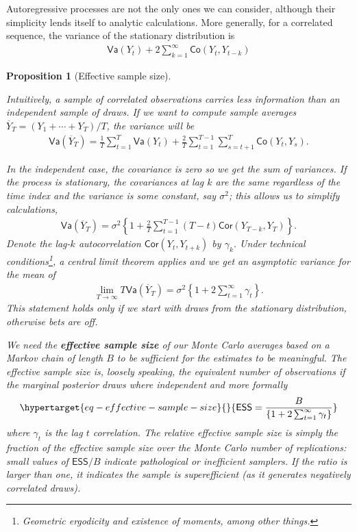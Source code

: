 \documentclass[
  11pt,
  letterpaper,
]{scrbook}
\theoremstyle{definition}
\theoremstyle{definition}
\theoremstyle{definition}
\theoremstyle{plain}
\newtheorem{proposition}{Proposition}[chapter]
\theoremstyle{remark}
\begin{document}
Autoregressive processes are not the only ones we can consider, although
their simplicity lends itself to analytic calculations. More generally,
for a correlated sequence, the variance of the stationary distribution
is \begin{align*}
\mathsf{Va}(Y_t) + 2 \sum_{k=1}^\infty \mathsf{Co}(Y_t, Y_{t-k})
\end{align*}

\begin{proposition}[Effective sample
size]\protect\hypertarget{prp-variance-clt}{}\label{prp-variance-clt}

Intuitively, a sample of correlated observations carries less
information than an independent sample of draws. If we want to compute
sample averages \(\overline{Y}_T=(Y_1+ \cdots + Y_T)/T\), the variance
will be \begin{align*}
\mathsf{Va}\left(\overline{Y}_T\right) = \frac{1}{T}\sum_{t=1}^T \mathsf{Va}(Y_t) + \frac{2}{T} \sum_{t=1}^{T-1}\sum_{s = t+1}^T \mathsf{Co}(Y_t, Y_s).
\end{align*}

In the independent case, the covariance is zero so we get the sum of
variances. If the process is stationary, the covariances at lag \(k\)
are the same regardless of the time index and the variance is some
constant, say \(\sigma^2\); this allows us to simplify calculations,
\begin{align*}
\mathsf{Va}(\overline{Y}_T) = \sigma^2 \left\{ 1 + \frac{2}{T}\sum_{t=1}^{T-1} (T-t) \mathsf{Cor}(Y_{T-k}, Y_{T})\right\}.
\end{align*} Denote the lag-\(k\) autocorrelation
\(\mathsf{Cor}(Y_{t}, Y_{t+k})\) by \(\gamma_k\). Under technical
conditions\footnote{Geometric ergodicity and existence of moments, among
  other things.}, a central limit theorem applies and we get an
asymptotic variance for the mean of \begin{align*}
\lim_{T \to \infty} T\mathsf{Va}\left(\overline{Y}_T\right) = \sigma^2 \left\{1+2\sum_{t=1}^\infty \gamma_t\right\}.
\end{align*} This statement holds only if we start with draws from the
stationary distribution, otherwise bets are off.

We need the \textbf{effective sample size} of our Monte Carlo averages
based on a Markov chain of length \(B\) to be sufficient for the
estimates to be meaningful. The effective sample size is, loosely
speaking, the equivalent number of observations if the marginal
posterior draws where independent and more formally
\begin{equation}\protect\hypertarget{eq-effective-sample-size}{}{
\mathsf{ESS} = \frac{B}{\left\{1+2\sum_{t=1}^\infty \gamma_t\right\}}
}\label{eq-effective-sample-size}\end{equation} where \(\gamma_t\) is
the lag \(t\) correlation. The relative effective sample size is simply
the fraction of the effective sample size over the Monte Carlo number of
replications: small values of \(\mathsf{ESS}/B\) indicate pathological
or inefficient samplers. If the ratio is larger than one, it indicates
the sample is superefficient (as it generates negatively correlated
draws).


\end{proposition}
\end{document}
